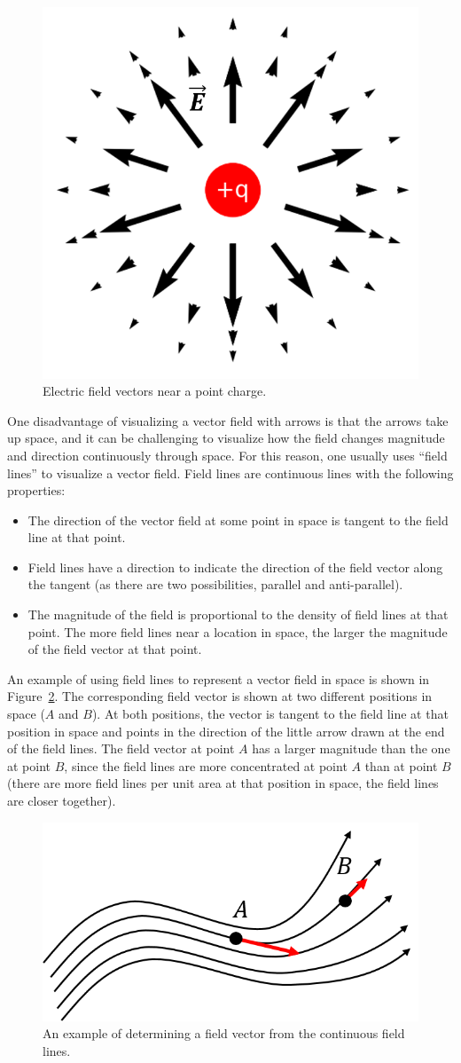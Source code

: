 \begin{figure}[!htbp]
\centering
\includegraphics[width=0.3\linewidth]{files/1pos-bd746d90e839613ec799f32b8e33f122.png}
\caption[]{Electric field vectors near a point charge.}
\label{fig:ChargesFields:1pos}
\end{figure}

One disadvantage of visualizing a vector field with arrows is that the arrows take up space, and it can be challenging to visualize how the field changes magnitude and direction continuously through space. For this reason, one usually uses ``field lines'' to visualize a vector field. Field lines are continuous lines with the following properties:

\begin{itemize}
\item The direction of the vector field at some point in space is tangent to the field line at that point.
\item Field lines have a direction to indicate the direction of the field vector along the tangent (as there are two possibilities, parallel and anti-parallel).
\item The magnitude of the field is proportional to the density of field lines at that point. The more field lines near a location in space, the larger the magnitude of the field vector at that point.
\end{itemize}

An example of using field lines to represent a vector field in space is shown in Figure~\ref{fig:chargesfields:fieldlines}. The corresponding field vector is shown at two different positions in space ($A$ and $B$). At both positions, the vector is tangent to the field line at that position in space and points in the direction of the little arrow drawn at the end of the field lines. The field vector at point $A$ has a larger magnitude than the one at point $B$, since the field lines are more concentrated at point $A$ than at point $B$ (there are more field lines per unit area at that position in space, the field lines are closer together).

\begin{figure}[!htbp]
\centering
\includegraphics[width=0.4\linewidth]{files/fieldlines-3399c98223e3f2a01d954a6b769618be.png}
\caption[]{An example of determining a field vector from the continuous field lines.}
\label{fig:chargesfields:fieldlines}
\end{figure}

